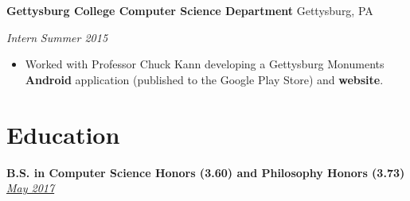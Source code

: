 \documentclass[11pt]{article}
\begin{document}
\textbf{Gettysburg College Computer Science Department}
\hfill
Gettysburg, PA

\textit{Intern}
\hfill
\textit{Summer 2015}

\begin{itemize}
	\item Worked with Professor Chuck Kann developing a Gettysburg Monuments \textbf{Android} application (published to the Google Play Store) and \textbf{website}. 
\end{itemize}











\section*{Education}
\textbf{\large{B.S. in Computer Science {\footnotesize Honors (3.60)} and Philosophy {\footnotesize Honors (3.73)}}}
\hfill
\href{https://www.gettysburg.edu/commencement/2017/pdfs/2017\%20Commencement\%20Program\%20FINAL.pdf}{\textit{May 2017}}
\end{document}
